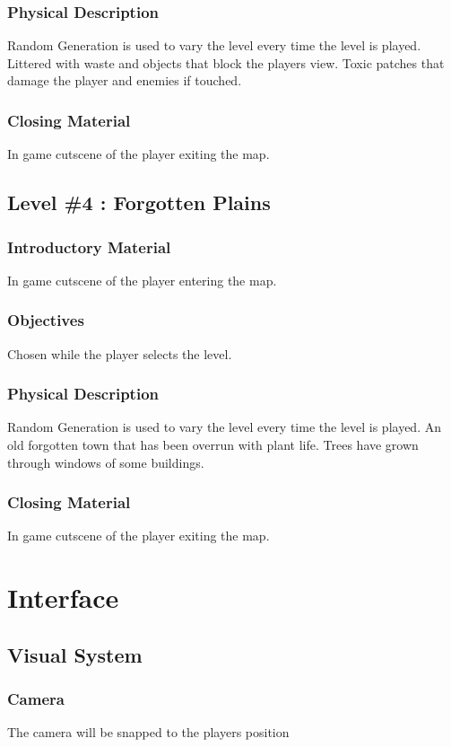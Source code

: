 \documentclass{article}
\begin{document}
\subsubsection{Physical Description}
\label{sec:org4b37b5a}
Random Generation is used to vary the level every time the level is played.
Littered with waste and objects that block the players view.
Toxic patches that damage the player and enemies if touched.
\subsubsection{Closing Material}
\label{sec:org0d86124}
In game cutscene of the player exiting the map.
\subsection{Level \#4 : Forgotten Plains}
\label{sec:orgfbf4cc2}
\subsubsection{Introductory Material}
\label{sec:org1d80405}
In game cutscene of the player entering the map.
\subsubsection{Objectives}
\label{sec:org00b201d}
Chosen while the player selects the level.
\subsubsection{Physical Description}
\label{sec:org4ff9a02}
Random Generation is used to vary the level every time the level is played.
An old forgotten town that has been overrun with plant life.
Trees have grown through windows of some buildings.
\subsubsection{Closing Material}
\label{sec:org6f78ea2}
In game cutscene of the player exiting the map.
\section{Interface}
\label{sec:org49d6f40}
\subsection{Visual System}
\label{sec:org74772dd}
\subsubsection{Camera}
\label{sec:org37166d7}
The camera will be snapped to the players position
\end{document}

